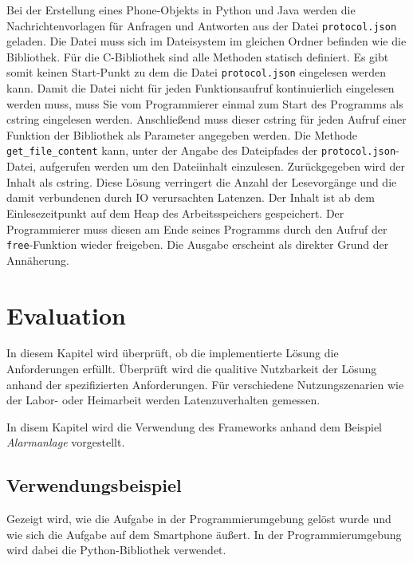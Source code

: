\documentclass[11pt,a4paper]{report}
\begin{document}
Bei der Erstellung eines Phone-Objekts in Python und Java werden die Nachrichtenvorlagen für Anfragen und Antworten aus der Datei \texttt{protocol.json} geladen.
Die Datei muss sich im Dateisystem im gleichen Ordner befinden wie die Bibliothek.
Für die C-Bibliothek sind alle Methoden statisch definiert.
Es gibt somit keinen Start-Punkt zu dem die Datei \texttt{protocol.json} eingelesen werden kann.
Damit die Datei nicht für jeden Funktionsaufruf kontinuierlich eingelesen werden muss, muss Sie vom Programmierer einmal zum Start des Programms als cstring eingelesen werden.
Anschließend muss dieser cstring für jeden Aufruf einer Funktion der Bibliothek als Parameter angegeben werden.
Die Methode \texttt{get\_file\_content} kann, unter der Angabe des Dateipfades der \texttt{protocol.json}-Datei, aufgerufen werden um den Dateiinhalt einzulesen.
Zurückgegeben wird der Inhalt als cstring.
Diese Lösung verringert die Anzahl der Lesevorgänge und die damit verbundenen durch IO verursachten Latenzen.
Der Inhalt ist ab dem Einlesezeitpunkt auf dem Heap des Arbeitsspeichers gespeichert.
Der Programmierer muss diesen am Ende seines Programms durch den Aufruf der \texttt{free}-Funktion wieder freigeben.
Die Ausgabe erscheint als direkter Grund der Annäherung.


\chapter{Evaluation}\label{chap:eval}
In diesem Kapitel wird überprüft, ob die implementierte Lösung die Anforderungen erfüllt.
Überprüft wird die qualitive Nutzbarkeit der Lösung anhand der spezifizierten Anforderungen.
Für verschiedene Nutzungszenarien wie der Labor- oder Heimarbeit werden Latenzuverhalten gemessen.

In disem Kapitel wird die Verwendung des Frameworks anhand dem Beispiel \textit{Alarmanlage} vorgestellt.
\section{Verwendungsbeispiel}
Gezeigt wird, wie die Aufgabe in der Programmierumgebung gelöst wurde und wie sich die Aufgabe auf dem Smartphone äußert.
In der Programmierumgebung wird dabei die Python-Bibliothek verwendet.
\end{document}
